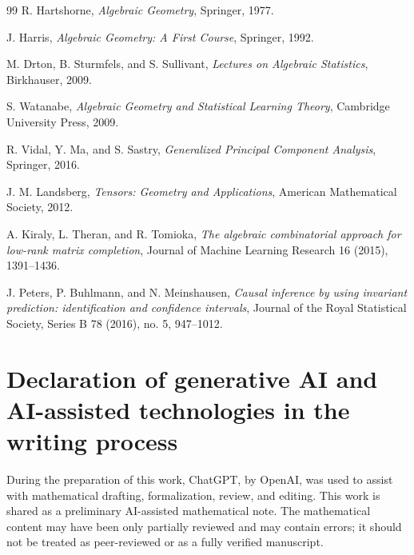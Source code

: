 \documentclass[11pt]{article}
\begin{document}
\begin{thebibliography}{99}
R. Hartshorne,
\emph{Algebraic Geometry},
Springer, 1977.

J. Harris,
\emph{Algebraic Geometry: A First Course},
Springer, 1992.

M. Drton, B. Sturmfels, and S. Sullivant,
\emph{Lectures on Algebraic Statistics},
Birkhauser, 2009.

S. Watanabe,
\emph{Algebraic Geometry and Statistical Learning Theory},
Cambridge University Press, 2009.

R. Vidal, Y. Ma, and S. Sastry,
\emph{Generalized Principal Component Analysis},
Springer, 2016.

J. M. Landsberg,
\emph{Tensors: Geometry and Applications},
American Mathematical Society, 2012.

A. Kiraly, L. Theran, and R. Tomioka,
\emph{The algebraic combinatorial approach for low-rank matrix completion},
Journal of Machine Learning Research 16 (2015), 1391--1436.

J. Peters, P. Buhlmann, and N. Meinshausen,
\emph{Causal inference by using invariant prediction: identification and confidence intervals},
Journal of the Royal Statistical Society, Series B 78 (2016), no. 5, 947--1012.

\end{thebibliography}

\section*{Declaration of generative AI and AI-assisted technologies in the writing process}
During the preparation of this work, ChatGPT, by OpenAI, was used to assist with mathematical drafting, formalization, review, and editing. This work is shared as a preliminary AI-assisted mathematical note. The mathematical content may have been only partially reviewed and may contain errors; it should not be treated as peer-reviewed or as a fully verified manuscript.
\end{document}
